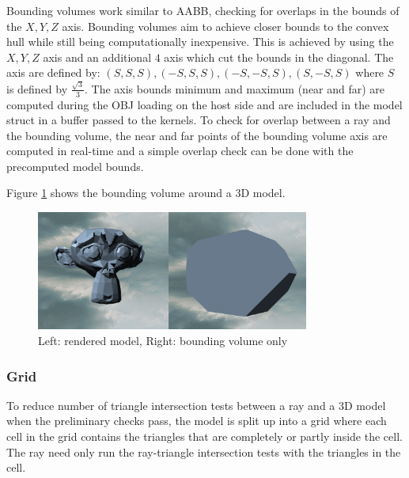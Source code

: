 \documentclass[final]{cmpreport}
\begin{document}
Bounding volumes work similar to AABB, checking for overlaps in the bounds of the $X, Y, Z$ axis. Bounding volumes aim to achieve closer bounds to the convex hull while still being computationally inexpensive. This is achieved by using the $X, Y, Z$ axis and an additional $4$ axis which cut the bounds in the diagonal. The axis are defined by: $(S, S ,S), (-S, S ,S), (-S, -S, S), (S, -S, S)$ where $S$ is defined by $\frac{\sqrt{3}}{3}$. The axis bounds minimum and maximum (near and far) are computed during the OBJ loading on the host side and are included in the model struct in a buffer passed to the kernels. To check for overlap between a ray and the bounding volume, the near and far points of the bounding volume axis are computed in real-time and a simple overlap check can be done with the precomputed model bounds.

Figure \ref{bvimage} shows the bounding volume around a 3D model.

\begin{figure}
    \centering
    \includegraphics[width=0.8\textwidth]{img/bounding_volume.png}
    \caption{Left: rendered model, Right: bounding volume only}
    \label{bvimage}
\end{figure}

\subsubsection{Grid}

To reduce number of triangle intersection tests between a ray and a 3D model when the preliminary checks pass, the model is split up into a grid where each cell in the grid contains the triangles that are completely or partly inside the cell. The ray need only run the ray-triangle intersection tests with the triangles in the cell.
\end{document}

